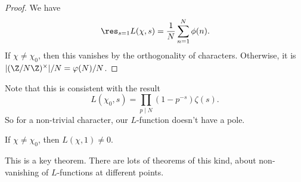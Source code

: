 \documentclass[a4paper]{article}
\begin{document}
\begin{proof}
  We have
  \[
    \res_{s = 1} L(\chi, s) = \frac{1}{N}\sum_{n = 1}^N \phi(n).
  \]
  If $\chi \not= \chi_0$, then this vanishes by the orthogonality of characters. Otherwise, it is $|(\Z/N\Z)^\times|/N = \varphi(N)/N$.
\end{proof}
Note that this is consistent with the result 
\[
  L(\chi_0, s) = \prod_{p \mid N} (1 - p^{-s}) \zeta(s).
\]
So for a non-trivial character, our $L$-function doesn't have a pole.

\begin{thm}[]
  If $\chi \not= \chi_0$, then $L(\chi, 1) \not= 0$.
\end{thm}
This is a key theorem. There are lots of theorems of this kind, about non-vanishing of $L$-functions at different points.
\end{document}
